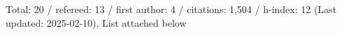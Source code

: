 Total: 20 / refereed: 13 / first author: 4 / citations: 1,504 / h-index: 12 (Last updated: 2025-02-10), List attached below